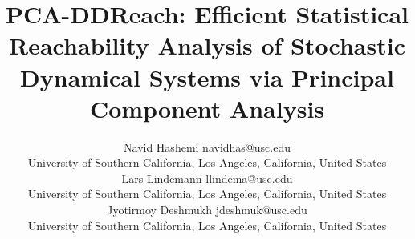 \documentclass[twoside,11pt]{article}
\begin{document}
\title{PCA-DDReach: Efficient Statistical Reachability Analysis of Stochastic Dynamical Systems via Principal Component Analysis}
\author{\name Navid Hashemi     \email navidhas@usc.edu \\
       \addr University of Southern California, Los Angeles, California, United States\\
       \AND
       \name Lars Lindemann        \email llindema@usc.edu \\
       \addr University of Southern California, Los Angeles, California, United States\\
       \AND
       \name Jyotirmoy Deshmukh \email jdeshmuk@usc.edu\\
       \addr University of Southern California, Los Angeles, California, United States\\
       }





\end{document}
